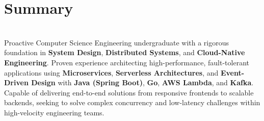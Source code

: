 \MainDivider
\section*{Summary}
\BigDivider\\
\noindent
Proactive Computer Science Engineering undergraduate with a rigorous foundation in \textbf{System Design}, \textbf{Distributed Systems}, and \textbf{Cloud-Native Engineering}. Proven experience architecting high-performance, fault-tolerant applications using \textbf{Microservices}, \textbf{Serverless Architectures}, and \textbf{Event-Driven Design} with \textbf{Java (Spring Boot)}, \textbf{Go}, \textbf{AWS Lambda}, and \textbf{Kafka}. Capable of delivering end-to-end solutions from responsive frontends to scalable backends, seeking to solve complex concurrency and low-latency challenges within high-velocity engineering teams.
